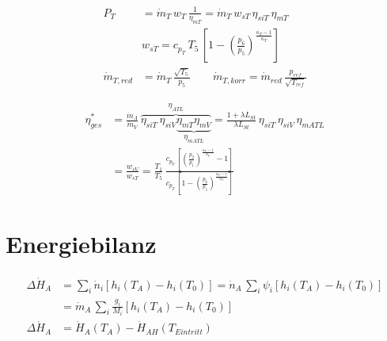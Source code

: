 \documentclass[english,threecolumn,color]{latex4ei/latex4ei_sheet}
\begin{document}
\begin{sectionbox}

	\begin{align*}
		P_T&=\dot{m}_T \, w_T \, \frac{1}{\eta_{mT}} = \dot{m}_T \, w_{sT} \, \eta_{siT}\,\eta_{mT}\\
		&w_{sT}=c_{p_T}\,T_5 \, \left[1- \left( \frac{p_6}{p_5} \right)^{\frac{\kappa_T-1}{\kappa_T}}  \right]\\
		\dot{m}_{T,red}&=\dot{m}_T \, \frac{\sqrt{T_5}}{p_5} \qquad \dot{m}_{T,korr}=\dot{m}_{red} \, \frac{p_{ref}}{\sqrt{T_{ref}}}
	\end{align*}
\end{sectionbox}
\begin{sectionbox}
	\begin{align*}
		\eta^{*}_{ges}&=\frac{\dot{m}_A}{\dot{m}_V}\,\overbrace{\eta_{siT} \, \eta_{siV}  \underbrace{\eta_{mT} \eta_{mV}}_{ \eta_{mATL}}}^{\eta_{ATL}}=\frac{1+\lambda L_{St}}{\lambda L_{St}}\, \eta_{siT}\,  \eta_{siV}\, \eta_{mATL}\\
		&= \frac{w_{sV}}{w_{sT}} =\frac{T_1}{T_5}\, \frac{c_{p_V}\,\left[ \left( \frac{p_2}{p_1} \right)^{\frac{\kappa_V-1}{\kappa_V}} -1 \right]}{c_{p_T}\, \left[1- \left( \frac{p_6}{p_5} \right)^{\frac{\kappa_T-1}{\kappa_T}}  \right]}
	\end{align*}
\end{sectionbox}


\section{Energiebilanz}
\begin{sectionbox}
	\begin{align*}
		\varDelta \dot{H}_A&=\sum_{i}\dot{n}_i \left[ h_i(T_A) - h_i(T_0) \right]
		=\dot{n}_A \,\sum_{i} \psi_i \left[ h_i(T_A) - h_i(T_0) \right]\\
		&=\dot{m}_A \,\sum_{i}\frac{g_i}{M_i} \left[ h_i(T_A) - h_i(T_0) \right]\\
		\varDelta\dot{H}_A&= \dot{H}_A(T_A) -\dot{H}_{AH}(T_{Eintritt})
	\end{align*}
\end{sectionbox}
\end{document}
